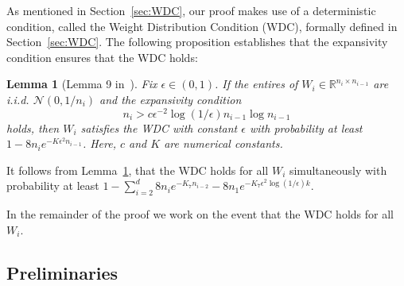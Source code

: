 \documentclass[11pt]{article}
\newtheorem{lemma}[theorem]{Lemma}
\newcommand{\R}{\mathbb{R}}
\newcommand{\eps}{\epsilon}
\newcommand{\xo}{x_\ast}
\newcommand\stepdir[1]{\tilde v_{#1}}
\begin{document}
As mentioned in Section~\ref{sec:WDC}, our proof makes use of a deterministic condition, called the Weight Distribution Condition (WDC), formally defined in Section~\ref{sec:WDC}.
The following proposition establishes that the expansivity condition ensures that the WDC holds:

\begin{lemma}[Lemma 9 in~\citep{hand_global_2017}] \label{thm-multi-layer}
Fix $\epsilon \in (0,1)$. If the entires of $W_i \in \R^{n_i \times n_{i-1}}$ are i.i.d. $\mathcal{N}(0, 1/n_i)$ and the expansivity condition 
\[
n_i > c \eps^{-2} \log(1/\eps) n_{i-1} \log n_{i-1}
\]
holds,
then $W_i$ satisfies the WDC with constant $\eps$ with probability at least $1 - 8 n_i e^{- K \epsilon^2 n_{i-1} }$.
Here, $c$ and $K$ are numerical constants.
\end{lemma}

It follows from Lemma~\ref{thm-multi-layer}, that the WDC holds for all $W_i$ simultaneously with probability at least $1- \sum_{i=2}^d 8 n_i e^{-K_7 n_{i-2} }
- 8 n_1 e^{-K_7 \epsilon^{2} \log(1/\epsilon) k }$.

In the remainder of the proof we work on the event that the WDC holds for all $W_i$.




\subsection{Preliminaries}

%
\end{document}
